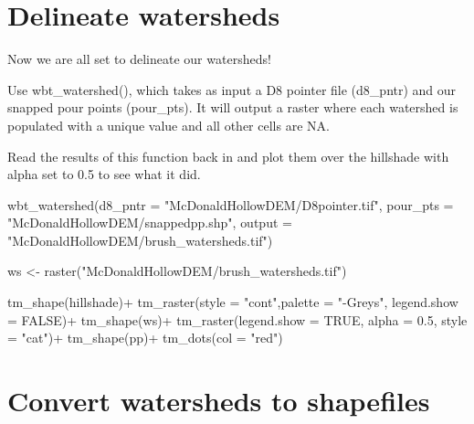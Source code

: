 \documentclass[
]{book}
\newenvironment{Shaded}{\begin{snugshade}}{\end{snugshade}}
\newcommand{\AttributeTok}[1]{\textcolor[rgb]{0.77,0.63,0.00}{#1}}
\newcommand{\ConstantTok}[1]{\textcolor[rgb]{0.00,0.00,0.00}{#1}}
\newcommand{\FloatTok}[1]{\textcolor[rgb]{0.00,0.00,0.81}{#1}}
\newcommand{\FunctionTok}[1]{\textcolor[rgb]{0.00,0.00,0.00}{#1}}
\newcommand{\NormalTok}[1]{#1}
\newcommand{\OtherTok}[1]{\textcolor[rgb]{0.56,0.35,0.01}{#1}}
\newcommand{\SpecialCharTok}[1]{\textcolor[rgb]{0.00,0.00,0.00}{#1}}
\newcommand{\StringTok}[1]{\textcolor[rgb]{0.31,0.60,0.02}{#1}}
\begin{document}
\hypertarget{delineate-watersheds}{%
\section{Delineate watersheds}\label{delineate-watersheds}}

Now we are all set to delineate our watersheds!

Use wbt\_watershed(), which takes as input a D8 pointer file (d8\_pntr) and our snapped pour points (pour\_pts). It will output a raster where each watershed is populated with a unique value and all other cells are NA.

Read the results of this function back in and plot them over the hillshade with alpha set to 0.5 to see what it did.

\begin{Shaded}
\begin{Highlighting}[]
\FunctionTok{wbt\_watershed}\NormalTok{(}\AttributeTok{d8\_pntr =} \StringTok{"McDonaldHollowDEM/D8pointer.tif"}\NormalTok{,}
              \AttributeTok{pour\_pts =} \StringTok{"McDonaldHollowDEM/snappedpp.shp"}\NormalTok{,}
              \AttributeTok{output =} \StringTok{"McDonaldHollowDEM/brush\_watersheds.tif"}\NormalTok{)}

\NormalTok{ws }\OtherTok{\textless{}{-}} \FunctionTok{raster}\NormalTok{(}\StringTok{"McDonaldHollowDEM/brush\_watersheds.tif"}\NormalTok{)}

\FunctionTok{tm\_shape}\NormalTok{(hillshade)}\SpecialCharTok{+}
  \FunctionTok{tm\_raster}\NormalTok{(}\AttributeTok{style =} \StringTok{"cont"}\NormalTok{,}\AttributeTok{palette =} \StringTok{"{-}Greys"}\NormalTok{, }\AttributeTok{legend.show =} \ConstantTok{FALSE}\NormalTok{)}\SpecialCharTok{+}
\FunctionTok{tm\_shape}\NormalTok{(ws)}\SpecialCharTok{+}
  \FunctionTok{tm\_raster}\NormalTok{(}\AttributeTok{legend.show =} \ConstantTok{TRUE}\NormalTok{, }\AttributeTok{alpha =} \FloatTok{0.5}\NormalTok{, }\AttributeTok{style =} \StringTok{"cat"}\NormalTok{)}\SpecialCharTok{+}
\FunctionTok{tm\_shape}\NormalTok{(pp)}\SpecialCharTok{+}
  \FunctionTok{tm\_dots}\NormalTok{(}\AttributeTok{col =} \StringTok{"red"}\NormalTok{)}
\end{Highlighting}
\end{Shaded}

\hypertarget{convert-watersheds-to-shapefiles}{%
\section{Convert watersheds to shapefiles}\label{convert-watersheds-to-shapefiles}}
\end{document}
